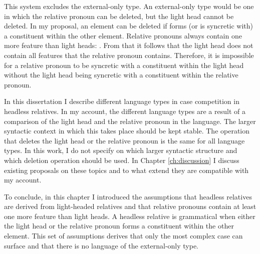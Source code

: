 This system excludes the external-only type. An external-only type would be one in which the relative pronoun can be deleted, but the light head cannot be deleted. In my proposal, an element can be deleted if forms (or is syncretic with) a constituent within the other element. Relative pronouns always contain one more feature than light heads: . From that it follows that the light head does not contain all features that the relative pronoun contains. Therefore, it is impossible for a relative pronoun to be syncretic with a constituent within the light head without the light head being syncretic with a constituent within the relative pronoun.

In this dissertation I describe different language types in case competition in headless relatives. In my account, the different language types are a result of a comparison of the light head and the relative pronoun in the language.
The larger syntactic context in which this takes place should be kept stable. The operation that deletes the light head or the relative pronoun is the same for all language types. In this work, I do not specify on which larger syntactic structure and which deletion operation should be used. In Chapter \ref{ch:discussion} I discuss existing proposals on these topics and to what extend they are compatible with my account.

To conclude, in this chapter I introduced the assumptions that headless relatives are derived from light-headed relatives and that relative pronouns contain at least one more feature than light heads. A headless relative is grammatical when either the light head or the relative pronoun forms a constituent within the other element. This set of assumptions derives that only the most complex case can surface and that there is no language of the external-only type.

